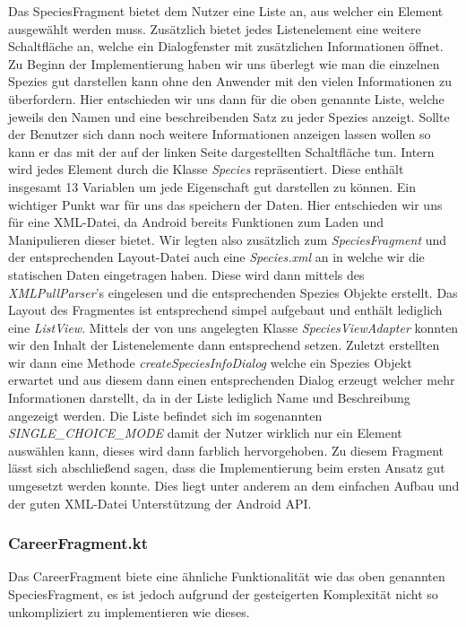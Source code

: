 Das SpeciesFragment bietet dem Nutzer eine Liste an, aus welcher ein Element ausgewählt werden muss. Zusätzlich bietet jedes Listenelement eine weitere Schaltfläche an, welche ein Dialogfenster mit zusätzlichen Informationen öffnet. Zu Beginn der Implementierung haben wir uns überlegt wie man die einzelnen Spezies gut darstellen kann ohne den Anwender mit den vielen Informationen zu überfordern. Hier entschieden wir uns dann für die oben genannte Liste, welche jeweils den Namen und eine beschreibenden Satz zu jeder Spezies anzeigt. Sollte der Benutzer sich dann noch weitere Informationen anzeigen lassen wollen so kann er das mit der auf der linken Seite dargestellten Schaltfläche tun. Intern wird jedes Element durch die Klasse \textit{Species} repräsentiert. Diese enthält insgesamt 13 Variablen um jede Eigenschaft gut darstellen zu können. Ein wichtiger Punkt war für uns das speichern der Daten. Hier entschieden wir uns für eine XML-Datei, da Android bereits Funktionen zum Laden und Manipulieren dieser bietet. Wir legten also zusätzlich zum \textit{SpeciesFragment} und der entsprechenden Layout-Datei auch eine \textit{Species.xml} an in welche wir die statischen Daten eingetragen haben. Diese wird dann mittels des \textit{XMLPullParser}'s eingelesen und die entsprechenden Spezies Objekte erstellt. Das Layout des Fragmentes ist entsprechend simpel aufgebaut und enthält lediglich eine \textit{ListView}. Mittels der von uns angelegten Klasse \textit{SpeciesViewAdapter} konnten wir den Inhalt der Listenelemente dann entsprechend setzen. Zuletzt erstellten wir dann eine Methode \textit{createSpeciesInfoDialog} welche ein Spezies Objekt erwartet und aus diesem dann einen entsprechenden Dialog erzeugt welcher mehr Informationen darstellt, da in der Liste lediglich Name und Beschreibung angezeigt werden. Die Liste befindet sich im sogenannten \textit{SINGLE\_CHOICE\_MODE} damit der Nutzer wirklich nur ein Element auswählen kann, dieses wird dann farblich hervorgehoben. Zu diesem Fragment lässt sich abschließend sagen, dass die Implementierung beim ersten Ansatz gut umgesetzt werden konnte. Dies liegt unter anderem an dem einfachen Aufbau und der guten XML-Datei Unterstützung der Android API.

\subsubsection{CareerFragment.kt}

Das CareerFragment biete eine ähnliche Funktionalität wie das oben genannten SpeciesFragment, es ist jedoch aufgrund der gesteigerten Komplexität nicht so unkompliziert zu implementieren wie dieses. 

